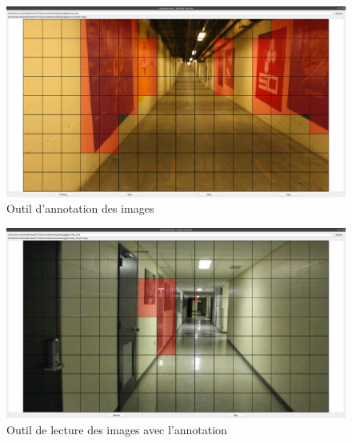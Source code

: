     \begin{figure}[H]
        \centering
        \includegraphics[width=15cm]{images/outil_annotation.png}
        \caption{Outil d'annotation des images}
        \label{fig:outil_annotation}
    \end{figure}

    \begin{figure}[H]
        \centering
        \includegraphics[width=15cm]{images/outil_lecture.png}
        \caption{Outil de lecture des images avec l'annotation}
        \label{fig:outil_lecture}
    \end{figure}

